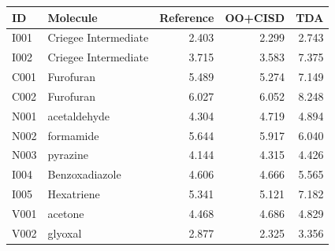 \begin{tabular}{llrrr}\hline
ID & Molecule & Reference & OO+CISD & TDA \\ \hline
I001 & Criegee Intermediate & 2.403 & 2.299 & 2.743 \\
I002 & Criegee Intermediate & 3.715 & 3.583 & 7.375 \\
C001 & Furofuran & 5.489 & 5.274 & 7.149 \\
C002 & Furofuran & 6.027 & 6.052 & 8.248 \\
N001 & acetaldehyde & 4.304 & 4.719 & 4.894 \\
N002 & formamide & 5.644 & 5.917 & 6.040 \\
N003 & pyrazine & 4.144 & 4.315 & 4.426 \\
I004 & Benzoxadiazole & 4.606 & 4.666 & 5.565 \\
I005 & Hexatriene & 5.341 & 5.121 & 7.182 \\
V001 & acetone & 4.468 & 4.686 & 4.829 \\
V002 & glyoxal & 2.877 & 2.325 & 3.356 \\
\hline\end{tabular}
